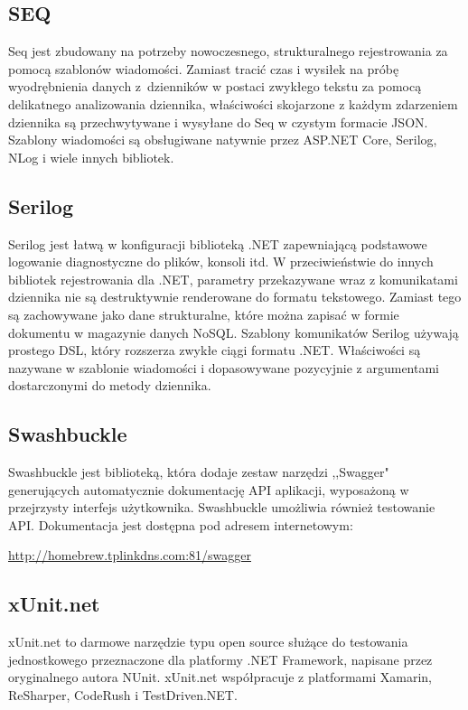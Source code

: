 \documentclass[12pt,a4paper]{article}
\begin{document}
		\subsection{SEQ}
			\indent Seq jest zbudowany na potrzeby nowoczesnego, strukturalnego rejestrowania za pomocą szablonów wiadomości. Zamiast tracić czas i wysiłek na próbę
				wyodrębnienia danych z~dzienników w postaci zwykłego tekstu za pomocą delikatnego analizowania dziennika, właściwości skojarzone z każdym zdarzeniem
				dziennika są przechwytywane i wysyłane do Seq w czystym formacie JSON. Szablony wiadomości są obsługiwane natywnie przez ASP.NET Core, Serilog, NLog
				i wiele innych bibliotek. 

		\subsection{Serilog}
			\indent Serilog jest łatwą w konfiguracji biblioteką .NET zapewniającą podstawowe logowanie diagnostyczne do plików, konsoli itd. W przeciwieństwie do innych bibliotek
				rejestrowania dla .NET, parametry przekazywane wraz z komunikatami dziennika nie są destruktywnie renderowane do formatu tekstowego. Zamiast tego są zachowywane
				jako dane strukturalne, które można zapisać w formie dokumentu w magazynie danych NoSQL. Szablony komunikatów Serilog używają prostego DSL, który rozszerza
				zwykłe ciągi formatu .NET. Właściwości są nazywane w szablonie wiadomości i dopasowywane pozycyjnie z argumentami dostarczonymi do metody dziennika.
		
		\subsection{Swashbuckle}
			\indent Swashbuckle jest biblioteką, która dodaje zestaw narzędzi ,,Swagger" generujących automatycznie dokumentację API aplikacji,
				wyposażoną w przejrzysty interfejs użytkownika. Swashbuckle umożliwia również testowanie API. Dokumentacja jest dostępna pod adresem internetowym:
			\begin{tcolorbox}[minipage,colback=white,arc=0pt,outer arc=0pt, fontupper=\scriptsize]
				\center					
				\url{http://homebrew.tplinkdns.com:81/swagger}
			\end{tcolorbox}

		\subsection{xUnit.net}
			\indent xUnit.net to darmowe narzędzie typu open source służące do testowania jednostkowego
			przeznaczone dla platformy .NET Framework, napisane przez oryginalnego autora NUnit.
			xUnit.net współpracuje z platformami Xamarin, ReSharper, CodeRush i TestDriven.NET.
	
\end{document}
